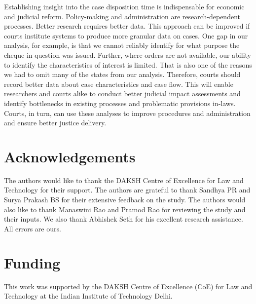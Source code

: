 \documentclass[12pt,a4paper]{article}
\begin{document}
	
	Establishing insight into the case disposition time is indispensable for economic and judicial reform. Policy-making and administration are research-dependent processes. Better research requires better data. This approach can be improved if courts institute systems to produce more granular data on cases. One gap in our analysis, for example, is that we cannot reliably identify for what purpose the cheque in question was issued. Further, where orders are not available, our ability to identify the characteristics of interest is limited. That is also one of the reasons we had to omit many of the states from our analysis. Therefore, courts should record better data about case characteristics and case flow. This will enable researchers and courts alike to conduct better judicial impact assessments and identify bottlenecks in existing processes and problematic provisions in-laws. Courts, in turn, can use these analyses to improve procedures and administration and ensure better justice delivery.
	
	
	
	\section*{Acknowledgements}
	The authors would like to thank the DAKSH Centre of Excellence for Law and Technology for their support. The authors are grateful to thank Sandhya PR and Surya Prakash BS for their extensive feedback on the study. The authors would also like to thank Manaswini Rao and Pramod Rao for reviewing the study and their inputs. We also thank Abhishek Seth for his excellent research assistance. All errors are ours.
	
	\section*{Funding}
	This work was supported by the DAKSH Centre of Excellence (CoE) for Law and Technology at the Indian Institute of Technology Delhi.
	
\end{document}
